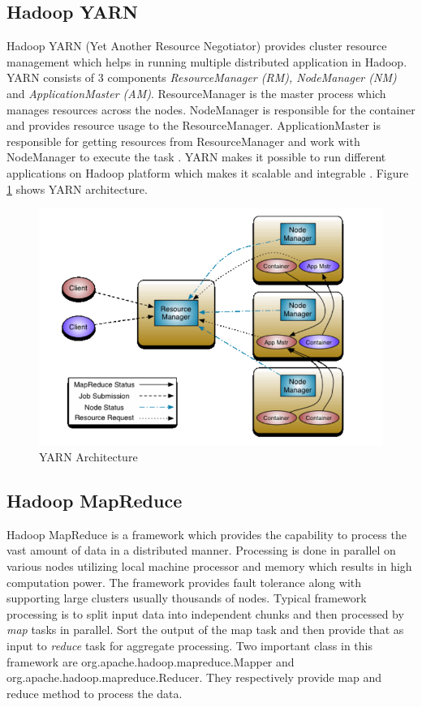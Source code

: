 \documentclass[sigconf]{acmart}
\begin{document}
\subsection{Hadoop YARN}
Hadoop YARN (Yet Another Resource Negotiator) provides cluster resource management which helps in running multiple distributed application in Hadoop. YARN consists of 3 components \emph{ResourceManager (RM), NodeManager (NM)} and \emph{ApplicationMaster (AM)}. ResourceManager is the master process which manages resources across the nodes. NodeManager is responsible for the container and provides resource usage to the ResourceManager. ApplicationMaster is responsible for getting resources from ResourceManager and work with NodeManager to execute the task \cite{www-apache-yarn}. YARN makes it possible to run different applications on Hadoop platform which makes it scalable and integrable \cite[Ch.\ 3, p. 65]{AchariShiva2015HE}.
Figure \ref{f:yarn-arch} shows YARN architecture.
\begin{figure}[!ht]
  \centering\includegraphics[width=\columnwidth]{images/yarnArch.PNG}
  \caption{YARN Architecture \cite{www-apache-yarn}}\label{f:yarn-arch}
\end{figure}

\subsection{Hadoop MapReduce}
Hadoop MapReduce is a framework which provides the capability to process the vast amount of data in a distributed manner. Processing is done in parallel on various nodes utilizing local machine processor and memory which results in high computation power. The framework provides fault tolerance along with supporting large clusters usually thousands of nodes. Typical framework processing is to split input data into independent chunks and then processed by \emph{map} tasks in parallel. Sort the output of the map task and then provide that as input to \emph{reduce} task for aggregate processing. Two important class in this framework are org.apache.hadoop.mapreduce.Mapper and org.apache.hadoop.mapreduce.Reducer. They respectively provide map and reduce method to process the data. 
\end{document}
